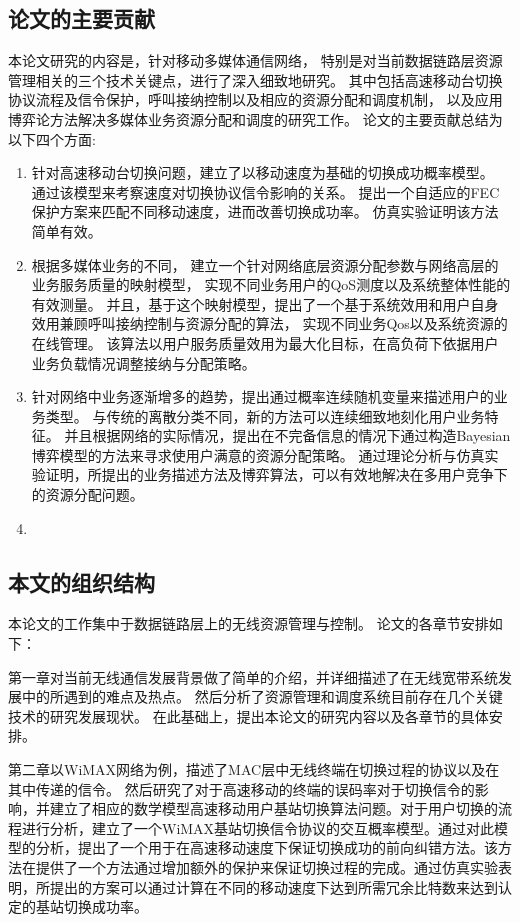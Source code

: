 \subsection{论文的主要贡献}
本论文研究的内容是，针对移动多媒体通信网络，
特别是对当前数据链路层资源管理相关的三个技术关键点，进行了深入细致地研究。
其中包括高速移动台切换协议流程及信令保护，呼叫接纳控制以及相应的资源分配和调度机制，
以及应用博弈论方法解决多媒体业务资源分配和调度的研究工作。
论文的主要贡献总结为以下四个方面:
\begin{enumerate}[(1.)]
\item 
针对高速移动台切换问题，建立了以移动速度为基础的切换成功概率模型。
通过该模型来考察速度对切换协议信令影响的关系。
提出一个自适应的FEC保护方案来匹配不同移动速度，进而改善切换成功率。
仿真实验证明该方法简单有效。

\item 
根据多媒体业务的不同，
建立一个针对网络底层资源分配参数与网络高层的业务服务质量的映射模型，
实现不同业务用户的QoS测度以及系统整体性能的有效测量。
并且，基于这个映射模型，提出了一个基于系统效用和用户自身效用兼顾呼叫接纳控制与资源分配的算法，
实现不同业务Qos以及系统资源的在线管理。
该算法以用户服务质量效用为最大化目标，在高负荷下依据用户业务负载情况调整接纳与分配策略。

\item 
针对网络中业务逐渐增多的趋势，提出通过概率连续随机变量来描述用户的业务类型。
与传统的离散分类不同，新的方法可以连续细致地刻化用户业务特征。
并且根据网络的实际情况，提出在不完备信息的情况下通过构造Bayesian博弈模型的方法来寻求使用户满意的资源分配策略。
通过理论分析与仿真实验证明，所提出的业务描述方法及博弈算法，可以有效地解决在多用户竞争下的资源分配问题。

\item 

\end{enumerate}

\subsection{本文的组织结构}
本论文的工作集中于数据链路层上的无线资源管理与控制。
论文的各章节安排如下：

第一章对当前无线通信发展背景做了简单的介绍，并详细描述了在无线宽带系统发展中的所遇到的难点及热点。
然后分析了资源管理和调度系统目前存在几个关键技术的研究发展现状。
在此基础上，提出本论文的研究内容以及各章节的具体安排。
\par %
第二章以WiMAX网络为例，描述了MAC层中无线终端在切换过程的协议以及在其中传递的信令。
然后研究了对于高速移动的终端的误码率对于切换信令的影响，并建立了相应的数学模型高速移动用户基站切换算法问题。对于用户切换的流程进行分析，建立了一个WiMAX基站切换信令协议的交互概率模型。通过对此模型的分析，提出了一个用于在高速移动速度下保证切换成功的前向纠错方法。该方法在提供了一个方法通过增加额外的保护来保证切换过程的完成。通过仿真实验表明，所提出的方案可以通过计算在不同的移动速度下达到所需冗余比特数来达到认定的基站切换成功率。

